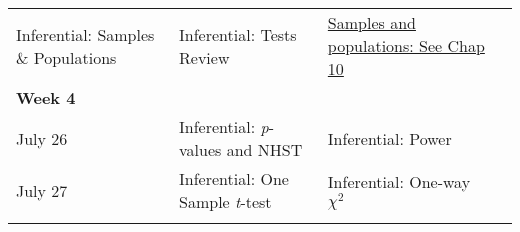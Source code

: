 \documentclass[
]{book}
\begin{document}
\begin{longtable}[]{@{}llll@{}}
\begin{minipage}[t]{0.32\columnwidth}
Inferential: Samples \& Populations\strut
\end{minipage} & \begin{minipage}[t]{0.29\columnwidth}\raggedright
Inferential: Tests Review\strut
\end{minipage} & \begin{minipage}[t]{0.18\columnwidth}\raggedright
\href{https://learningstatisticswithr.com/lsr-0.6.pdf}{Samples and populations: See Chap 10}\strut
\end{minipage}\tabularnewline
\begin{minipage}[t]{0.09\columnwidth}\raggedright
\textbf{Week 4}\strut
\end{minipage} & \begin{minipage}[t]{0.32\columnwidth}\raggedright
\strut
\end{minipage} & \begin{minipage}[t]{0.29\columnwidth}\raggedright
\strut
\end{minipage} & \begin{minipage}[t]{0.18\columnwidth}\raggedright
\strut
\end{minipage}\tabularnewline
\begin{minipage}[t]{0.09\columnwidth}\raggedright
July 26\strut
\end{minipage} & \begin{minipage}[t]{0.32\columnwidth}\raggedright
Inferential: \emph{p}-values and NHST\strut
\end{minipage} & \begin{minipage}[t]{0.29\columnwidth}\raggedright
Inferential: Power\strut
\end{minipage} & \begin{minipage}[t]{0.18\columnwidth}\raggedright
\strut
\end{minipage}\tabularnewline
\begin{minipage}[t]{0.09\columnwidth}\raggedright
July 27\strut
\end{minipage} & \begin{minipage}[t]{0.32\columnwidth}\raggedright
Inferential: One Sample \emph{t}-test\strut
\end{minipage} & \begin{minipage}[t]{0.29\columnwidth}\raggedright
Inferential: One-way \(\chi^2\)\strut
\end{minipage} & \begin{minipage}[t]{0.18\columnwidth}\raggedright
\strut
\end{minipage}\tabularnewline
\begin{minipage}[t]{0.09\columnwidth}\raggedright

\end{minipage}
\end{longtable}
\end{document}
